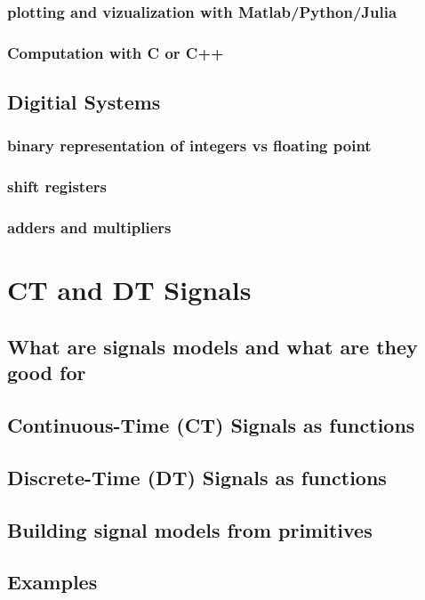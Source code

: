 \documentclass{article}
\begin{document}
\subsubsection{plotting and vizualization with Matlab/Python/Julia}
\label{sec:org4a1daa5}
\subsubsection{Computation with C or C++}
\label{sec:org851d19c}
\subsection{Digitial Systems}
\label{sec:orgc69c0d5}
\subsubsection{binary representation of integers vs floating point}
\label{sec:orge9caa00}
\subsubsection{shift registers}
\label{sec:org8a34038}
\subsubsection{adders and multipliers}
\label{sec:orga62b341}
\section{CT and DT Signals}
\label{sec:org3203c88}
\subsection{What are signals models and what are they good for}
\label{sec:orga6591cb}
\subsection{Continuous-Time (CT) Signals as functions}
\label{sec:org6225bd5}
\subsection{Discrete-Time (DT) Signals as functions}
\label{sec:orga54c05e}
\subsection{Building signal models from primitives}
\label{sec:org08f49f3}
\subsection{Examples}
\label{sec:orgf29c95e}
\end{document}
